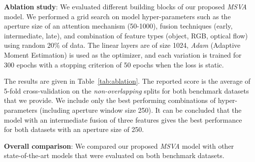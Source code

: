 \documentclass{article}
\begin{document}
\textbf{Ablation study}: We evaluated different building blocks of our proposed \textit{MSVA} model. We performed a grid search on model hyper-parameters such as the aperture size of an attention mechanism (\num{50}-\num{1000}), fusion techniques (early, intermediate, late), and combination of feature types (object, RGB, optical flow) using random \num{20}\% of data. 
The linear layers are of size \num{1024}, \emph{Adam} (Adaptive Moment Estimation) is used as the optimizer, and each variation is trained for \num{300} epochs with a stopping criterion of 50 epochs when the loss is static.


The results are given in Table~\ref{tab:ablation}. 
The reported score is the average  of 5-fold cross-validation on the \textit{non-overlapping} splits for both benchmark datasets that we provide. We include only the best performing combinations of hyper-parameters (including aperture window size 250). It can be concluded that the model with an intermediate fusion of three features gives the best performance for both datasets with an aperture size of \num{250}.
																											   
											 

																													 
			  

																																																																																																																																																																																																																																																																																						  
					
																																																																	 

\textbf{Overall comparison}: We compared our proposed \textit{MSVA} model with other state-of-the-art models that were evaluated on both benchmark datasets. 
																				
\end{document}
